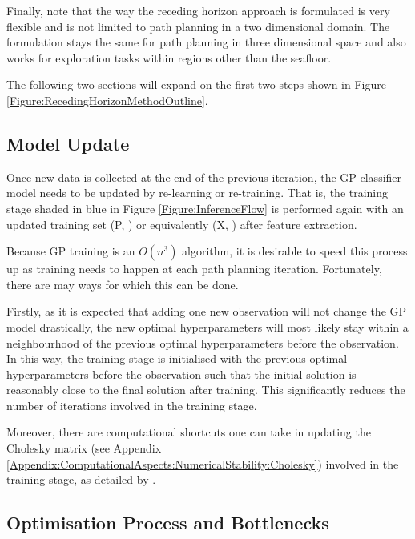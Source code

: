 			Finally, note that the way the receding horizon approach is formulated is very flexible and is not limited to path planning in a two dimensional domain. The formulation stays the same for path planning in three dimensional space and also works for exploration tasks within regions other than the seafloor.
			
			The following two sections will expand on the first two steps shown in Figure \ref{Figure:RecedingHorizonMethodOutline}.
	
		\subsection{Model Update}
		\label{InformativeSeafloorExploration:RecedingHorizonFormulation:ModelUpdate}
				
			Once new data is collected at the end of the previous iteration, the GP classifier model needs to be updated by re-learning or re-training. That is, the training stage shaded in blue in Figure \ref{Figure:InferenceFlow} is performed again with an updated training set (P, ) or equivalently (X, ) after feature extraction.
			
			Because GP training is an $O(n^{3})$ algorithm, it is desirable to speed this process up as training needs to happen at each path planning iteration. Fortunately, there are may ways for which this can be done.
			
			Firstly, as it is expected that adding one new observation will not change the GP model drastically, the new optimal hyperparameters will most likely stay within a neighbourhood of the previous optimal hyperparameters before the observation. In this way, the training stage is initialised with the previous optimal hyperparameters before the observation such that the initial solution is reasonably close to the final solution after training. This significantly reduces the number of iterations involved in the training stage.
			
			Moreover, there are computational shortcuts one can take in updating the Cholesky matrix (see Appendix \ref{Appendix:ComputationalAspects:NumericalStability:Cholesky}) involved in the training stage, as detailed by \cite{osborne_bayesian_2010}.
			
		\subsection{Optimisation Process and Bottlenecks}
		\label{InformativeSeafloorExploration:RecedingHorizonFormulation:OptimisationProcess}
	
